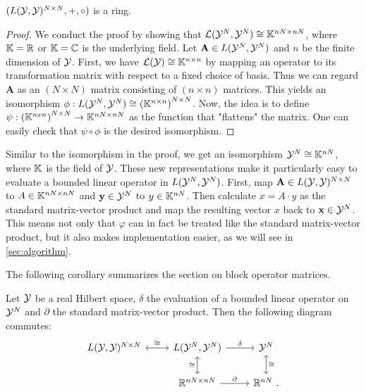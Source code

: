 \begin{theorem}
	\label{theo:product-space-ring}
	$(L(\mathcal{Y}, \mathcal{Y})^{N\times N}, +, \circ)$ is a ring.
\end{theorem}
\begin{proof}
	We conduct the proof by showing that $\mathcal{L}(\mathcal{Y}^N, \mathcal{Y}^N) \cong \mathbb{K}^{nN \times nN}$, where $\mathbb{K} = \mathbb{R}$ or $\mathbb{K} = \mathbb{C}$ is the underlying field.
	Let $\mathbf{A} \in L(\mathcal{Y}^N, \mathcal{Y}^N)$ and $n$ be the finite dimension of $\mathcal{Y}$.
	First, we have $\mathcal{L}(\mathcal{Y}) \cong \mathbb{K}^{n\times n}$ by mapping an operator to its transformation matrix with respect to a fixed choice of basis.
	Thus we can regard $\mathbf{A}$ as an $(N \times N)$ matrix consisting of $(n \times n)$ matrices.
	This yields an isomorphism $\phi: L(\mathcal{Y}^N, \mathcal{Y}^N) \cong \left(\mathbb{K}^{n\times n}\right)^{N \times N}$.
	Now, the idea is to define $\psi:\left(\mathbb{K}^{nxn}\right)^{N \times N} \rightarrow \mathbb{K}^{nN \times nN}$ as the function that "flattens" the matrix.
	One can easily check that $\psi \circ \phi$ is the desired isomorphism.
\end{proof}

%

Similar to the isomorphism in the proof, we get an isomorphism $\mathcal{Y}^N \cong \mathbb{K}^{nN}$, where $\mathbb{K}$ is the field of $\mathcal{Y}$.
These new representations make it particularly easy to evaluate a bounded linear operator in $L(\mathcal{Y}^N, \mathcal{Y}^N)$.
First, map $\mathbf{A} \in L(\mathcal{Y}, \mathcal{Y})^{N\times N}$ to $A \in \mathbb{K}^{nN \times nN}$ and $\mathbf{y} \in \mathcal{Y}^N$ to $y \in \mathbb{K}^{nN}$.
Then calculate $x = A \cdot y$ as the standard matrix-vector product and map the resulting vector $x$ back to $\mathbf{x} \in \mathcal{Y}^N$.
This means not only that $\varphi$ can in fact be treated like the standard matrix-vector product, but it also makes implementation easier, as we will see in \cref{sec:algorithm}.

The following corollary summarizes the section on block operator matrices.
\begin{corollary}
	\label{cor:matrix-vector-equivalence}
	\label{cor:matrix-ring-equivalence}
	Let $\mathcal{Y}$ be a real Hilbert space, $\delta$ the evaluation of a bounded linear operator on $\mathcal{Y}^N$ and $\partial$ the standard matrix-vector product. 
	Then the following diagram commutes:
	\begin{equation}
		\begin{tikzcd}
		 	L(\cY, \cY)^{N\times N} \arrow[leftrightarrow]{r}{\cong} &L(\cY^N, \cY^N) \arrow{r}{\delta} \arrow[swap, leftrightarrow]{d}{\cong} & \cY^N \arrow[leftrightarrow]{d}{\cong} \\%
			&\R^{nN \times nN} \arrow{r}{\partial}& \R^{nN} \ .
		\end{tikzcd}
	\end{equation}
\end{corollary}